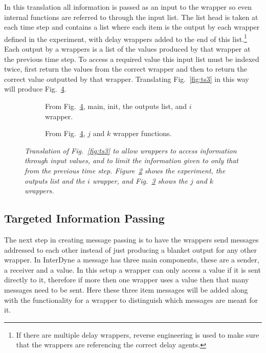 \documentclass{article}
\begin{document}
In this translation all information is passed as an input to the wrapper so even internal functions are referred to through the input list. The list head is taken at each time step and contains a list where each item is the output by each wrapper defined in the experiment, with delay wrappers added to the end of this list.\footnote{If there are multiple delay wrappers, reverse engineering is used to make sure that the wrappers are referencing the correct delay agents.} Each output by a wrappers is a list of the values produced by that wrapper at the previous time step. To access a required value this input list must be indexed twice, first return the values from the correct wrapper and then to return the correct value outputted by that wrapper. Translating Fig.~\ref{fig:ts3} in this way will produce Fig.~\ref{fig:ts4}.
\begin{figure}[H]
	\centering
	\begin{subfigure}[b]{1\textwidth}
	
	\caption{From Fig.~\ref{fig:ts4}, main, init, the outputs list, and $i$ wrapper.  }
        \label{fig:gull}
	\end{subfigure}
	\caption*{}
\end{figure}
	
\begin{figure}[H]\ContinuedFloat
	\centering
	\begin{subfigure}[b]{1\textwidth}
	
	\caption{From Fig.~\ref{fig:ts4}, $j$ and $k$ wrapper functions.  }
        \label{fig:gull2}
	\end{subfigure}
	\caption{\it Translation of Fig.~\ref{fig:ts3} to allow wrappers to access information through input values, and to limit the information given to only that from the previous time step. Figure~\ref{fig:gull} shows the experiment, the outputs list and the $i$ wrapper, and Fig.~\ref{fig:gull2} shows the $j$ and $k$ wrappers.}
	\label{fig:ts4}
\end{figure} 






\subsection{Targeted Information Passing}
The next step in creating message passing is to have the wrappers send messages addressed to each other instead of just producing a blanket output for any other wrapper. In InterDyne a message has three main components, these are a sender, a receiver and a value. In this setup a wrapper can only access a value if it is sent directly to it, therefore if more then one wrapper uses a value then that many messages need to be sent. Here these three item messages will be added along with the functionality for a wrapper to distinguish which messages are meant for it. 
\end{document}
